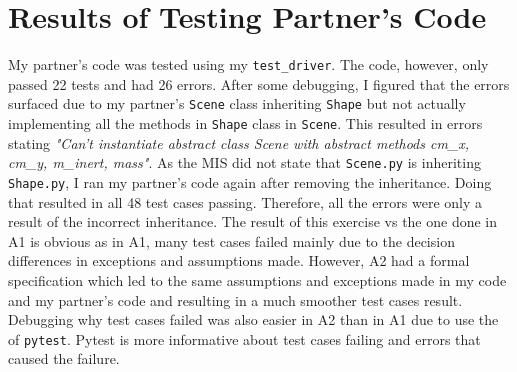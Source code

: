 \documentclass[12pt]{article}
\begin{document}
\section{Results of Testing Partner's Code}
My partner's code was tested using my \texttt{test\_driver}.
The code, however, only passed 22 tests and had 26 errors. After some debugging, I figured that the errors surfaced due to my partner's \texttt{Scene} class inheriting \texttt{Shape} but not actually implementing all the methods in \texttt{Shape} class in \texttt{Scene}. This resulted in errors stating 
\textit{"Can't instantiate abstract class Scene with abstract methods cm\_x, cm\_y, m\_inert, mass"}. As the MIS did not state that \texttt{Scene.py} is inheriting \texttt{Shape.py}, I ran my partner's code again after removing the inheritance. Doing that resulted in all 48 test cases passing. Therefore, all the errors were only a result of the incorrect inheritance. The result of this exercise vs the one done in A1 is obvious as in A1, many test cases failed mainly due to the decision differences in exceptions and assumptions made. However, A2 had a formal specification which led to the same assumptions and exceptions made in my code and my partner's code and resulting in a much smoother test cases result. Debugging why test cases failed was also easier in A2 than in A1 due to use the of \texttt{pytest}. Pytest is more informative about test cases failing and errors that caused the failure.
\end{document}
